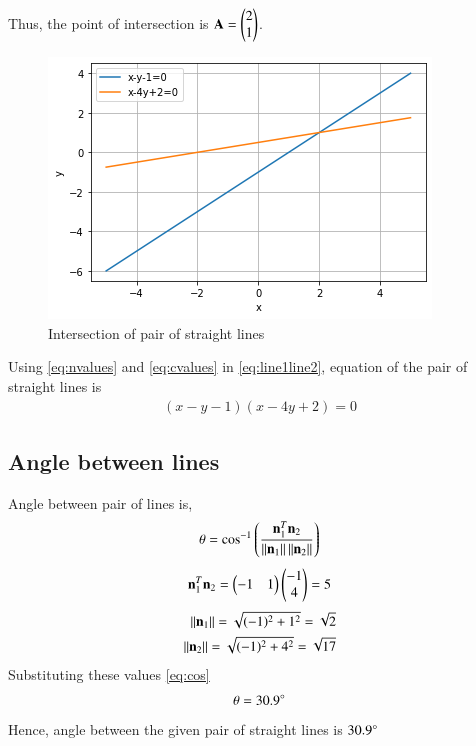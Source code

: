 \documentclass[journal,12pt,twocolumn]{IEEEtran}
\begin{document}
Thus, the point of intersection is $\mathbf{A} = \begin{pmatrix}2 \\ 1\end{pmatrix}$.
\renewcommand{\thefigure}{1}
\begin{figure}[h!]
    \centering
    \includegraphics[width=\columnwidth]{assignment3.png}
    \caption{Intersection of pair of straight lines}
    \label{fig:fig1}
\end{figure}

Using \eqref{eq:nvalues} and \eqref{eq:cvalues} in \eqref{eq:line1line2}, equation of the pair of straight lines is
\begin{align}
    (x-y-1)(x-4y+2) = 0
\end{align}

\subsection{Angle between lines}
Angle between pair of lines is,
\begin{align}\label{eq:cos}
    \theta = \cos^{-1}\left(\frac{\mathbf{n}_1^T\mathbf{n}_2}{\left\lVert\mathbf{n}_1\right\rVert\left\lVert\mathbf{n}_2\right\rVert}\right)
\end{align}
\begin{align}
    \mathbf{n}_1^T\mathbf{n}_2 = \begin{pmatrix}-1 & 1\end{pmatrix}\begin{pmatrix}-1 \\ 4\end{pmatrix} = 5 \label{eq:a2} 
\end{align}
\begin{align}
    \left\lVert\mathbf{n}_1\right\rVert=\sqrt{(-1)^2+1^2}=\sqrt{2}\\
    \left\lVert\mathbf{n}_2\right\rVert=\sqrt{(-1)^2+4^2}=\sqrt{17} \label{eq:}
\end{align}
Substituting these values \eqref{eq:cos}
\begin{align}
    \theta = 30.9\degree
\end{align}
Hence, angle between the given pair of straight lines is $30.9\degree$
\end{document}
